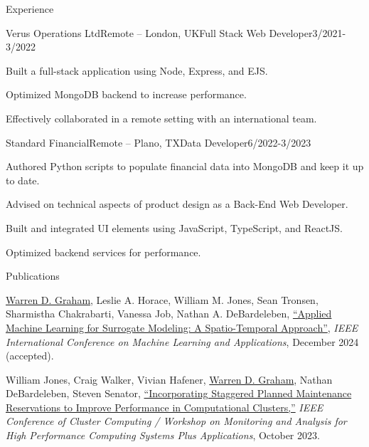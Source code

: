 \documentclass{resume} %
\begin{document}
\begin{rSection}{Experience}
\begin{rSubsection}{Verus Operations Ltd}{Remote – London, UK}{Full Stack Web Developer}{3/2021-3/2022}
  \item Built a full-stack application using Node, Express, and EJS.
  \item Optimized MongoDB backend to increase performance.
  \item Effectively collaborated in a remote setting with an international team.
\end{rSubsection}

\begin{rSubsection}{Standard Financial}{Remote – Plano, TX}{Data Developer}{6/2022-3/2023}
  \item Authored Python scripts to populate financial data into MongoDB and keep it up to date. 
  \item Advised on technical aspects of product design as a Back-End Web Developer.
  \item Built and integrated UI elements using JavaScript, TypeScript, and ReactJS.
  \item Optimized backend services for performance.
\end{rSubsection}

\end{rSection} 

\begin{rSection}{Publications} 
  \itemsep -1pt
  \renewcommand{\labelenumi}{[\theenumi]}
  \begin{etaremune}
    \item \underline{Warren D. Graham}, Leslie A. Horace, William M. Jones, Sean Tronsen, Sharmistha Chakrabarti, Vanessa Job, Nathan A. DeBardeleben, \href{https://www.icmla-conference.org/icmla24/ICMLA24_MC1_short.pdf}{“Applied Machine Learning for Surrogate Modeling: A Spatio-Temporal Approach”}, \textit{IEEE International Conference on Machine Learning and Applications}, December 2024 (accepted).
    \item William Jones, Craig Walker, Vivian Hafener, \underline{Warren D. Graham}, Nathan DeBardeleben, Steven Senator, \href{https://doi.ieeecomputersociety.org/10.1109/CLUSTERWorkshops61457.2023.00015}{“Incorporating Staggered Planned Maintenance Reservations to Improve Performance in Computational Clusters,”} \textit{IEEE Conference of Cluster Computing / Workshop on Monitoring and Analysis for High Performance Computing Systems Plus Applications}, October 2023.
  \end{etaremune}
\end{rSection}
\end{document}
